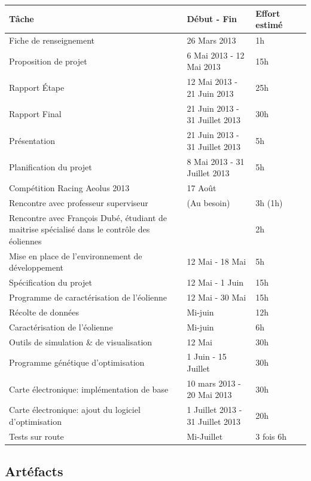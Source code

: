 \begin{tabu} to \linewidth {Xlll}
  \textbf{Tâche} & \textbf{Début - Fin} & \textbf{Effort estimé}\\ \hline
  Fiche de renseignement  & 26 Mars 2013 & 1h \\
  Proposition de projet   & 6 Mai 2013 - 12 Mai 2013 & 15h \\
  Rapport Étape           & 12 Mai 2013 - 21 Juin 2013 & 25h\\
  Rapport Final           & 21 Juin 2013 - 31 Juillet 2013 & 30h\\
  Présentation            & 21 Juin 2013 - 31 Juillet 2013 & 5h \\
  Planification du projet & 8 Mai 2013 - 31 Juillet 2013   & 5h\\
  Compétition Racing Aeolus 2013 & 17 Août & \\
  \hline
  Rencontre avec professeur superviseur & (Au besoin) & 3h (1h)\\
  Rencontre avec François Dubé, étudiant de maitrise spécialisé dans le contrôle des éoliennes
  & & 2h \\
  \hline
  Mise en place de l'environnement de développement & 12 Mai - 18 Mai & 5h \\
  Spécification du projet & 12 Mai - 1 Juin & 15h \\
  \hline
  Programme de caractérisation de l'éolienne & 12 Mai - 30 Mai & 15h\\
  Récolte de données                         & Mi-juin & 12h \\
  Caractérisation de l'éolienne              & Mi-juin & 6h\\
  \hline
  Outils de simulation \& de visualisation   & 12 Mai & 30h \\
  Programme génétique d'optimisation         & 1 Juin - 15 Juillet & 30h \\
  \hline
  Carte électronique: implémentation de base    & 10 mars 2013 - 20 Mai 2013 & 30h \\
  Carte électronique: ajout du logiciel d'optimisation & 1 Juillet 2013 - 31 Juillet 2013 & 20h \\
  \hline
  Tests sur route & Mi-Juillet & 3 fois 6h \\
  \hline
\end{tabu}
\subsection{Artéfacts} %
\label{sub:artefacts}

